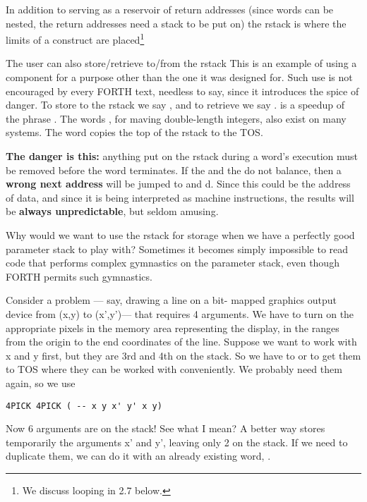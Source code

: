 In addition to serving as a reservoir of return addresses (since words can be nested, the return addresses need a stack to be put on) the rstack is where the limits of a  construct are placed\footnote{We discuss looping in 2.7 below.}

The user can also store/retrieve to/from the rstack This is an example of using a component for a purpose other than the one it was designed for. Such use is not encouraged by every FORTH text, needless to say, since it introduces the spice of danger. To store to the rstack we say , and to retrieve we say .  is a speedup of the phrase . The words  , for maving double-length integers, also exist on many systems. The word  copies the top of the rstack to the TOS.

\leftbar[1\linewidth]
\textbf{The danger is this:} anything put on the rstack during a word’s execution must be removed before the word terminates. If the  and the  do not balance, then a \textbf{wrong next address} will be jumped to and d. Since this could be the address of data, and since it is being interpreted as machine instructions, the results will be \textbf{always unpredictable}, but seldom amusing.
\endleftbar

Why would we want to use the rstack for storage when we have a perfectly good parameter stack to play with? Sometimes it becomes simply impossible to read code that performs complex gymnastics on the parameter stack, even though FORTH permits such gymnastics.

Consider a problem — say, drawing a line on a bit- mapped graphics output device from (x,y) to (x',y')— that requires 4 arguments. We have to turn on the appropriate pixels in the memory area representing the display, in the ranges from the origin to the end coordinates of the line. Suppose we want to work with x and y first, but they are 3rd and 4th on the stack. So we have to  or  to get them to TOS where they can be worked with conveniently. We probably need them again, so we use

\begin{lstlisting}
4PICK 4PICK ( -- x y x' y' x y)
\end{lstlisting}

Now 6 arguments are on the stack! See what I mean? A better way stores temporarily the arguments x’ and y', leaving only 2 on the stack. If we need to duplicate them, we can do it with an already existing word, .


